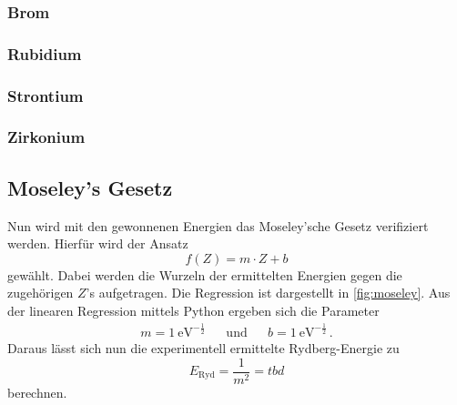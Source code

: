 \subsubsection{Brom}

\subsubsection{Rubidium}

\subsubsection{Strontium}

\subsubsection{Zirkonium}

\subsection{Moseley's Gesetz}
Nun wird mit den gewonnenen Energien das Moseley'sche Gesetz verifiziert werden.
Hierfür wird der Ansatz
\begin{equation*}
  f(Z) = m \cdot Z + b
\end{equation*}
gewählt. Dabei werden die Wurzeln der ermittelten Energien gegen die zugehörigen $Z$'s aufgetragen.
Die Regression ist dargestellt in \autoref{fig:moseley}.
Aus der linearen Regression mittels Python ergeben sich die Parameter
\begin{align*}
  m = \qty{1}{\eV}^{-\frac{1}{2}} && \text{und} && b  = \qty{1}{\eV}^{-\frac{1}{2}} \, .
\end{align*}
Daraus lässt sich nun die experimentell ermittelte Rydberg-Energie zu
\begin{equation*}
  E_\text{Ryd} = \frac{1}{m^2} = tbd
\end{equation*}
berechnen.

